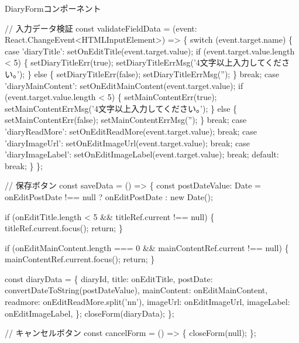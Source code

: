 \begin{starterprogram}[]{DiaryFormコンポーネント}
{    // 入力データ検証
    const validateFieldData = (event: React.ChangeEvent\textless{}HTMLInputElement\textgreater{}) =\textgreater{} \{
      switch (event.target.name) \{
        case 'diaryTitle':
          setOnEditTitle(event.target.value);
          if (event.target.value.length \textless{} 5) \{
            setDiaryTitleErr(true);
            setDiaryTitleErrMsg('4文字以上入力してください。');
          \} else \{
            setDiaryTitleErr(false);
            setDiaryTitleErrMsg('');
          \}
          break;
        case 'diaryMainContent':
          setOnEditMainContent(event.target.value);
          if (event.target.value.length \textless{} 5) \{
            setMainContentErr(true);
            setMainContentErrMsg('4文字以上入力してください。');
          \} else \{
            setMainContentErr(false);
            setMainContentErrMsg('');
          \}
          break;
        case 'diaryReadMore':
          setOnEditReadMore(event.target.value);
          break;
        case 'diaryImageUrl':
          setOnEditImageUrl(event.target.value);
          break;
        case 'diaryImageLabel':
          setOnEditImageLabel(event.target.value);
          break;
        default:
          break;
      \}
    \};

    // 保存ボタン
    const saveData = () =\textgreater{} \{
      const postDateValue: Date =
        onEditPostDate !== null ? onEditPostDate : new Date();

      if (onEditTitle.length \textless{} 5 \&\& titleRef.current !== null) \{
        titleRef.current.focus();
        return;
      \}

      if (onEditMainContent.length === 0 \&\& mainContentRef.current !== null) \{
        mainContentRef.current.focus();
        return;
      \}

      const diaryData = \{
        diaryId,
        title: onEditTitle,
        postDate: convertDateToString(postDateValue),
        mainContent: onEditMainContent,
        readmore: onEditReadMore.split('\reviewbackslash{}n\reviewbackslash{}n'),
        imageUrl: onEditImageUrl,
        imageLabel: onEditImageLabel,
      \};
      closeForm(diaryData);
    \};

    // キャンセルボタン
    const cancelForm = () =\textgreater{} \{
      closeForm(null);
    \};

}
\end{starterprogram}
